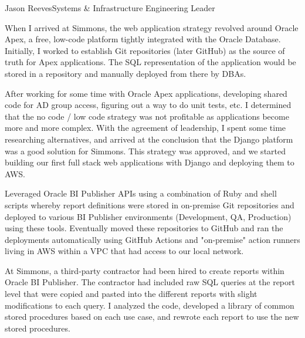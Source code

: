 \documentclass{article}
\begin{document}
\begin{cv}{Jason Reeves}{Systems \& Infrastructure Engineering Leader}
\begin{cvevent}[2019]
    When I arrived at Simmons, the web application strategy revolved around Oracle Apex, a free, low-code platform tightly integrated with the Oracle Database.  Initially, I worked to establish Git repositories (later GitHub) as the source of truth for Apex applications.  The SQL representation of the application would be stored in a repository and manually deployed from there by DBAs.

    \vspace*{3mm}
    After working for some time with Oracle Apex applications, developing shared code for AD group access, figuring out a way to do unit tests, etc. I determined that the no code / low code strategy was not profitable as applications become more and more complex.  With the agreement of leadership, I spent some time researching alternatives, and arrived at the conclusion that the Django platform was a good solution for Simmons.  This strategy was approved, and we started building our first full stack web applications with Django and deploying them to AWS.
    \vspace*{5mm}
\end{cvevent}

\begin{cvevent}[2018-2020]
    Leveraged Oracle BI Publisher APIs using a combination of Ruby and shell scripts whereby report definitions were stored in on-premise Git repositories and deployed to various BI Publisher environments (Development, QA, Production) using these tools.  Eventually moved these repositories to GitHub and ran the deployments automatically using GitHub Actions and "on-premise" action runners living in AWS within a VPC that had access to our local network.  
    \vspace*{5mm}
\end{cvevent}

\begin{cvevent}[2018-2020]
    At Simmons, a third-party contractor had been hired to create reports within Oracle BI Publisher.  The contractor had included raw SQL queries at the report level that were copied and pasted into the different reports with slight modifications to each query.  I analyzed the code, developed a library of common stored procedures based on each use case, and rewrote each report to use the new stored procedures.


\end{cvevent}
\end{cv}
\end{document}
